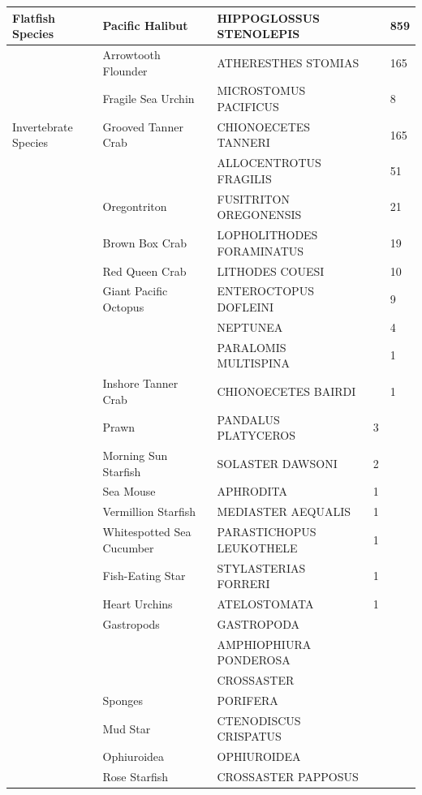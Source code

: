 \documentclass[12pt]{article}\usepackage[]{graphicx}\usepackage[]{color}
\begin{document}
\begin{table}[!h]
\begin{tabular}[t]{lllll}
Flatfish Species & Pacific Halibut & HIPPOGLOSSUS STENOLEPIS &  & 859\\
\midrule
 & Arrowtooth Flounder & ATHERESTHES STOMIAS &  & 165\\
 & Fragile Sea Urchin & MICROSTOMUS PACIFICUS &  & 8\\
Invertebrate Species & Grooved Tanner Crab & CHIONOECETES TANNERI &  & 165\\
 &  & ALLOCENTROTUS FRAGILIS &  & 51\\
 & Oregontriton & FUSITRITON OREGONENSIS &  & 21\\
 & Brown Box Crab & LOPHOLITHODES FORAMINATUS &  & 19\\
 & Red Queen Crab & LITHODES COUESI &  & 10\\
 & Giant Pacific Octopus & ENTEROCTOPUS DOFLEINI &  & 9\\
 &  & NEPTUNEA &  & 4\\
 &  & PARALOMIS MULTISPINA &  & 1\\
 & Inshore Tanner Crab & CHIONOECETES BAIRDI &  & 1\\
 & Prawn & PANDALUS PLATYCEROS & 3 & \\
 & Morning Sun Starfish & SOLASTER DAWSONI & 2 & \\
 & Sea Mouse & APHRODITA & 1 & \\
 & Vermillion Starfish & MEDIASTER AEQUALIS & 1 & \\
 & Whitespotted Sea Cucumber & PARASTICHOPUS LEUKOTHELE & 1 & \\
 & Fish-Eating Star & STYLASTERIAS FORRERI & 1 & \\
 & Heart Urchins & ATELOSTOMATA & 1 & \\
 & Gastropods & GASTROPODA &  & \\
 &  & AMPHIOPHIURA PONDEROSA &  & \\
 &  & CROSSASTER &  & \\
 & Sponges & PORIFERA &  & \\
 & Mud Star & CTENODISCUS CRISPATUS &  & \\
 & Ophiuroidea & OPHIUROIDEA &  & \\
 & Rose Starfish & CROSSASTER PAPPOSUS &  & \\
\bottomrule
\end{tabular}
\end{table}
\clearpage
\end{document}
